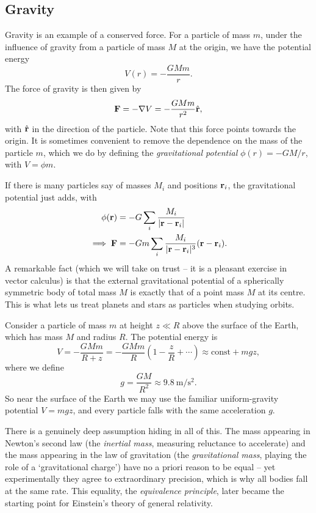 \documentclass[a4paper]{scrartcl}
\newcommand{\hh}[1]{\hat{\vv{#1}}}
\begin{document}
\subsection{Gravity}

Gravity is an example of a conserved force. For a particle of mass $m$, under the influence of gravity from a particle of mass $M$ at the origin, we have the potential energy
$$
V(r) = -\frac{GMm}{r}.
$$
The force of gravity is then given by
$$
\vv F = - \nabla V = -\frac{G Mm}{r^2} \hh r,
$$
with $\hh r$ in the direction of the particle. Note that this force points towards the origin.
It is sometimes convenient to remove the dependence on the mass of the particle $m$, which we do by defining the \emph{gravitational potential} $\phi(r) = -GM/r$, with $V = \phi m$.

If there is many particles say of masses $M_i$ and positions $\mathbf{r}_i$, the gravitational potential just adds, with
\begin{align*}
	\phi(\mathbf{r}) &= -G \sum_i \frac{M_i}{|\mathbf{r} - \mathbf{r}_i|} \\
\implies \mathbf{F} &= -Gm \sum_i \frac{M_i}{|\mathbf{r} - \mathbf{r}_i|^3} (\mathbf{r} - \mathbf{r}_i).
\end{align*}
A remarkable fact (which we will take on trust -- it is a pleasant exercise in vector calculus) is that the external gravitational potential of a spherically symmetric body of total mass $M$ is exactly that of a point mass $M$ at its centre. This is what lets us treat planets and stars as particles when studying orbits.

\begin{example}
	Consider a particle of mass $m$ at height $z \ll R$ above the surface of the Earth, which has mass $M$ and radius $R$. The potential energy is
	$$
	V = -\frac{GMm}{R + z} = -\frac{GMm}{R}\left(1 - \frac{z}{R} + \cdots\right) \approx \text{const} + mgz,
	$$
	where we define
	$$
	g = \frac{GM}{R^2} \approx \SI{9.8}{\meter\per\second\squared}.
	$$
	So near the surface of the Earth we may use the familiar uniform-gravity potential $V = mgz$, and every particle falls with the same acceleration $g$.
\end{example}

There is a genuinely deep assumption hiding in all of this. The mass appearing in Newton's second law (the \emph{inertial mass}, measuring reluctance to accelerate) and the mass appearing in the law of gravitation (the \emph{gravitational mass}, playing the role of a `gravitational charge') have no a priori reason to be equal -- yet experimentally they agree to extraordinary precision, which is why all bodies fall at the same rate. This equality, the \emph{equivalence principle}, later became the starting point for Einstein's theory of general relativity.
\end{document}
